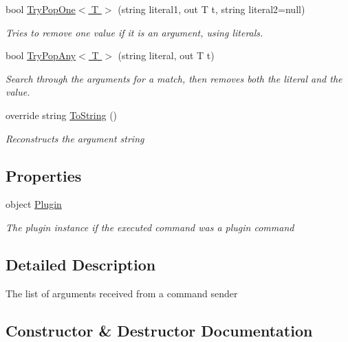 \begin{DoxyCompactItemize}
bool \hyperlink{class_o_t_a_1_1_command_1_1_argument_list_a92b68a49bb9daa5c7768f8e23ccfd3ee}{Try\+Pop\+One$<$ T $>$} (string literal1, out T t, string literal2=null)
\begin{DoxyCompactList}\small\item\em Tries to remove one value if it is an argument, using literals. \end{DoxyCompactList}\item 
bool \hyperlink{class_o_t_a_1_1_command_1_1_argument_list_a6f8dbac43875de36671456cbfc1ff587}{Try\+Pop\+Any$<$ T $>$} (string literal, out T t)
\begin{DoxyCompactList}\small\item\em Search through the arguments for a match, then removes both the literal and the value. \end{DoxyCompactList}\item 
override string \hyperlink{class_o_t_a_1_1_command_1_1_argument_list_acf39122af49357278a89dbd2d45d7a78}{To\+String} ()
\begin{DoxyCompactList}\small\item\em Reconstructs the argument string \end{DoxyCompactList}\end{DoxyCompactItemize}
\subsection*{Properties}
\begin{DoxyCompactItemize}
\item 
object \hyperlink{class_o_t_a_1_1_command_1_1_argument_list_a3f1da304ea4e797daf3f20599b81f268}{Plugin}
\begin{DoxyCompactList}\small\item\em The plugin instance if the executed command was a plugin command \end{DoxyCompactList}\end{DoxyCompactItemize}


\subsection{Detailed Description}
The list of arguments received from a command sender 



\subsection{Constructor \& Destructor Documentation}
\hypertarget{class_o_t_a_1_1_command_1_1_argument_list_a3af2e2d7b1fd7b2159dd8c69c83bc4a7}{}
